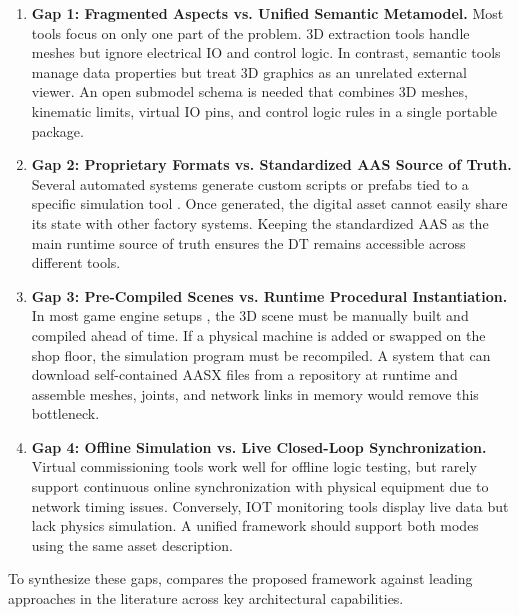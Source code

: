 \begin{enumerate}
    \item \textbf{Gap 1: Fragmented Aspects vs. Unified Semantic Metamodel.}
    Most tools focus on only one part of the problem. 3D extraction tools \cite{Chowdhury2025,Dong2024} handle meshes but ignore electrical \gls{IO} and control logic. In contrast, semantic tools \cite{Gollner2022,Perez2025} manage data properties but treat 3D graphics as an unrelated external viewer. An open submodel schema is needed that combines 3D meshes, kinematic limits, virtual \gls{IO} pins, and control logic rules in a single portable package.
    
    \item \textbf{Gap 2: Proprietary Formats vs. Standardized AAS Source of Truth.}
    Several automated systems generate custom scripts or prefabs tied to a specific simulation tool \cite{Alexopoulos2025,Schaper2025,Koch2024}. Once generated, the digital asset cannot easily share its state with other factory systems. Keeping the standardized \gls{AAS} as the main runtime source of truth ensures the \gls{DT} remains accessible across different tools.
    
    \item \textbf{Gap 3: Pre-Compiled Scenes vs. Runtime Procedural Instantiation.}
    In most game engine setups \cite{Alexopoulos2025,Pajpach2022,Garcia2025}, the 3D scene must be manually built and compiled ahead of time. If a physical machine is added or swapped on the shop floor, the simulation program must be recompiled. A system that can download self-contained \gls{AASX} files from a repository at runtime and assemble meshes, joints, and network links in memory would remove this bottleneck.
    
    \item \textbf{Gap 4: Offline Simulation vs. Live Closed-Loop Synchronization.}
    Virtual commissioning tools \cite{Striffler2023,Schaper2025} work well for offline logic testing, but rarely support continuous online synchronization with physical equipment due to network timing issues. Conversely, \gls{IOT} monitoring tools display live data but lack physics simulation. A unified framework should support both modes using the same asset description.
\end{enumerate}

To synthesize these gaps,  compares the proposed framework against leading approaches in the literature across key architectural capabilities.

